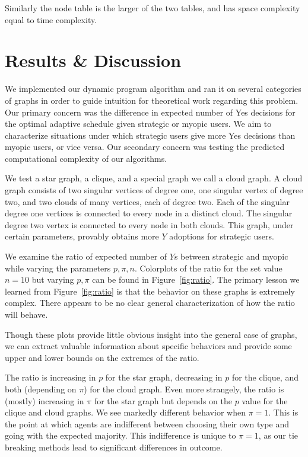 \documentclass{article}
\begin{document}
Similarly the node table is the larger of the two tables, and has space
complexity equal to time complexity.

\section{Results \& Discussion}
We implemented our dynamic program algorithm and ran it on several categories of graphs in order to guide intuition for theoretical work regarding this problem. Our primary concern was the difference in expected number of Yes decisions for the optimal adaptive schedule given strategic or myopic users. We aim to characterize situations under which strategic users give more Yes decisions than myopic users, or vice versa. Our secondary concern was testing the predicted computational complexity of our algorithms.

We test a star graph, a clique, and a special graph we call a cloud graph. A cloud graph consists of two singular vertices of degree one, one singular vertex of degree two, and two clouds of many vertices, each of degree two. Each of the singular degree one vertices is connected to every node in a distinct cloud. The singular degree two vertex is connected to every node in both clouds. This graph, under certain parameters, provably obtains more $Y$ adoptions for strategic users.

We examine the ratio of expected number of $Y$s between strategic and myopic while varying the parameters $p, \pi, n$. Colorplots of the ratio for the set value $n=10$ but varying $p, \pi$ can be found in Figure~\ref{fig:ratio}. The primary lesson we learned from Figure~\ref{fig:ratio} is that the behavior on these graphs is extremely complex. There appears to be no clear general characterization of how the ratio will behave.

Though these plots provide little obvious insight into the general case of graphs, we can extract valuable information about specific behaviors and provide some upper and lower bounds on the extremes of the ratio.

The ratio is increasing in $p$ for the star graph, decreasing in $p$ for the clique, and both (depending on $\pi$) for the cloud graph. Even more strangely, the ratio is (mostly) increasing in $\pi$ for the star graph but depends on the $p$ value for the clique and cloud graphs. We see markedly different behavior when $\pi = 1$. This is the point at which agents are indifferent between choosing their own type and going with the expected majority. This indifference is unique to $\pi=1$, as our tie breaking methods lead to significant differences in outcome.
\end{document}
